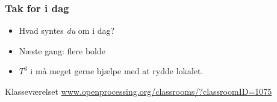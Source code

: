 \documentclass{beamer}
\begin{document}
\begin{frame}
  \frametitle{Tak for i dag}

  \begin{itemize}
  \item Hvad syntes \emph{du} om i dag?
  \item Næste gang: flere bolde
  \item $T^3$ i må meget gerne hjælpe med at rydde lokalet.
  \end{itemize}

  \begin{block}{Klasseværelset}
    \url{www.openprocessing.org/classrooms/?classroomID=1075}
  \end{block}

\end{frame}
\end{document}
